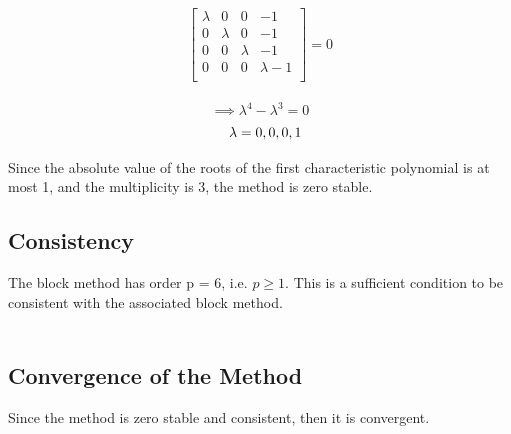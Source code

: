 \documentclass[12pt]{report}
\begin{document}
\[
\left[
\begin{array}{cccc}
\lambda & 0 & 0 & -1 \\
0 & \lambda & 0 & -1 \\
0 & 0 & \lambda & -1 \\
0 & 0 & 0 & \lambda -1 \\
\end{array}
\right] = 0
\]
\\
\[ \implies \lambda^4 - \lambda^3 = 0 \]
\[ \hspace{3mm} \lambda = 0, 0, 0, 1 \] 

\noindent Since the absolute value of the roots of the first characteristic polynomial is at most 1, and the multiplicity is 3, the method is zero stable.

\subsection{Consistency}
The block method has order p = 6, i.e. $p\geq1$. This is a sufficient condition to be consistent with the associated block method.
\\\\
\subsection{Convergence of the Method}
Since the method is zero stable and consistent, then it is convergent.







\bigskip	

\bigskip

\bigskip
\bigskip
\bigskip
\bigskip
\bigskip
\end{document}
